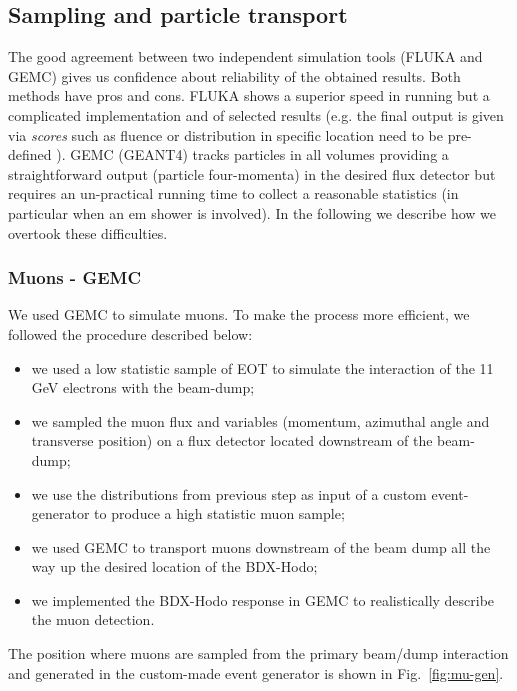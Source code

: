 \subsection{Sampling  and particle transport}\label{sec:sampling}
The good agreement between two independent simulation tools (FLUKA and GEMC)  gives us confidence about reliability of the obtained results. Both methods have pros and cons. FLUKA shows a superior speed in running but a complicated implementation and of selected results (e.g. the final output is given via {\it scores} such as fluence or distribution in specific location  need to be pre-defined ). GEMC (GEANT4) tracks particles in all volumes providing a straightforward  output (particle four-momenta) in the desired flux detector but requires an un-practical running time to collect a reasonable statistics (in particular when an em shower is involved). In the following we describe how we overtook these difficulties.

\subsubsection{Muons - GEMC}\label{sec:gmc-mu}
We used GEMC to simulate muons. To make the  process more efficient, we followed the   procedure described below: 
\begin{itemize}
\item  we used a low statistic sample of EOT to simulate the interaction of the 11 GeV electrons with the beam-dump;
\item  we sampled the muon flux and variables (momentum, azimuthal angle and transverse position)  on a flux detector located downstream of the beam-dump;
\item we use the distributions from previous step as input of a custom event-generator to produce a high statistic muon sample;
\item we used GEMC to transport muons  downstream of the beam dump all the way up the desired location of the BDX-Hodo;
\item  we implemented  the  BDX-Hodo response in GEMC to realistically describe the muon detection.
\end{itemize}
The position where muons are sampled from the primary beam/dump interaction and generated in the custom-made event generator is shown in Fig.~\ref{fig:mu-gen}.

